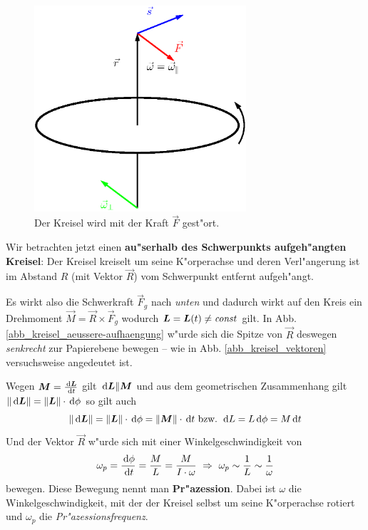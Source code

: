 \begin{figure}[h]
   \centering
   \includegraphics[width=0.7\textwidth]{bilder/kreiselsoerung}
   \caption[Gestörter Kreisel]{Der Kreisel wird mit der Kraft $\vec F$
     gest"ort.}
   \label{abb_kreiselstoerung}
\end{figure}

\bigskip


Wir betrachten jetzt einen \textbf{au"serhalb des Schwerpunkts
  aufgeh"angten Kreisel}: Der Kreisel kreiselt um seine K"orperachse und
deren Verl"angerung ist im Abstand $R$ (mit Vektor $\vec R$) vom
Schwerpunkt entfernt aufgeh"angt.

Es wirkt also die Schwerkraft $\vec F_g$ nach \emph{unten} und dadurch
wirkt auf den Kreis ein Drehmoment $\vec M = \vec R \times \vec F_g$
wodurch $\boldsymbol{L} = \boldsymbol{L} (t) \neq \text{\emph{const}}$ gilt. In
Abb. \ref{abb_kreisel_aeussere-aufhaengung} w"urde sich die Spitze von
$\vec R$ deswegen \emph{senkrecht} zur Papierebene bewegen -- wie in
Abb. \ref{abb_kreisel_vektoren} versuchsweise angedeutet ist.


Wegen $\boldsymbol{M} = \frac{\, \mathrm{d} \boldsymbol{L}}{\, \mathrm{d} t }$ gilt $\, \mathrm{d} \boldsymbol{L} \|
\boldsymbol{M}$ und aus dem geometrischen Zusammenhang gilt $\|\, \mathrm{d} \boldsymbol{L} \|=
\|\boldsymbol{L} \|\cdot \, \mathrm{d} \phi$ so gilt auch
\begin{equation}
   \label{eq:52}
   \|\, \mathrm{d} \boldsymbol{L}\| = \|\boldsymbol{L}\| \cdot \, \mathrm{d} \phi = \|\boldsymbol{M}\| \cdot
   \, \mathrm{d} t \text{ bzw. } \, \mathrm{d} L = L \, \mathrm{d} \phi = M \, \mathrm{d} t
\end{equation}
Und der Vektor $\vec R$ w"urde sich mit einer Winkelgeschwindigkeit von 
\begin{equation}
   \label{eq:53}
   \omega_p = \frac{\, \mathrm{d} \phi}{\, \mathrm{d} t} = \frac{M}{L} = \frac{M}{I
     \cdot \omega} ~ \Rightarrow ~ \omega_p \sim \frac{1}{L} \sim \frac{1}{\omega}
\end{equation}
bewegen. Diese Bewegung nennt man
\textbf{Pr"azession}. Dabei ist $\omega$ die
Winkelgeschwindigkeit, mit der der Kreisel selbst um seine
K"orperachse rotiert und $\omega_p$ die \emph{Pr"azessionsfrequenz}.
 
